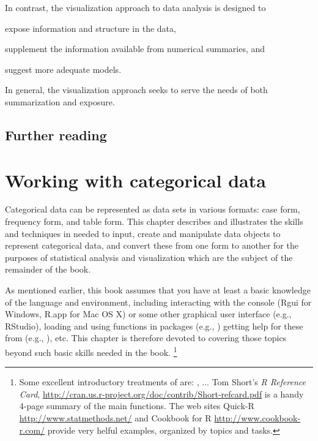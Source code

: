 \documentclass[11pt]{book}\usepackage[]{graphicx}\usepackage[]{color}
\begin{document}
In contrast, the visualization approach to data analysis is designed
to 
\begin{seriate}
\item expose information and structure in the data,
\item supplement the information available from numerical summaries, and 
\item suggest more adequate models.
\end{seriate}
In general, the visualization approach seeks to serve the needs of
both summarization and exposure.

\section{Further reading}\label{sec:ch01-reading}







\chapter{Working with categorical data}\label{ch:working}


Categorical data can be represented as data sets
in various formats:
case form, frequency form, and table form.  This chapter
describes and illustrates the skills and techniques in \R
needed to input, create and manipulate \R data objects
to represent categorical data, and convert these from one
form to another for the purposes of statistical analysis
and visualization which are the subject of the remainder of the book.

As mentioned earlier, this book assumes that you have at least a
basic knowledge of the \R language and environment, including
interacting with the \R console (Rgui for Windows, R.app for Mac OS X)
or some other graphical user interface (e.g., RStudio),
loading and using \R functions in packages (e.g., )
getting help for these from \R (e.g., ), etc.
This chapter is therefore devoted
to covering those topics beyond such basic skills needed in the book.%
\footnote{
Some excellent introductory treatments of \R are:
\citet[]{FoxWeisberg:2011}, ...
Tom Short's \emph{R Reference Card}, \url{http://cran.us.r-project.org/doc/contrib/Short-refcard.pdf} is a handy 4-page summary of the main functions.
The web sites
Quick-R \url{http://www.statmethods.net/} and
Cookbook for R \url{http://www.cookbook-r.com/}
provide very helful examples, organized by topics and tasks.
}
\end{document}
